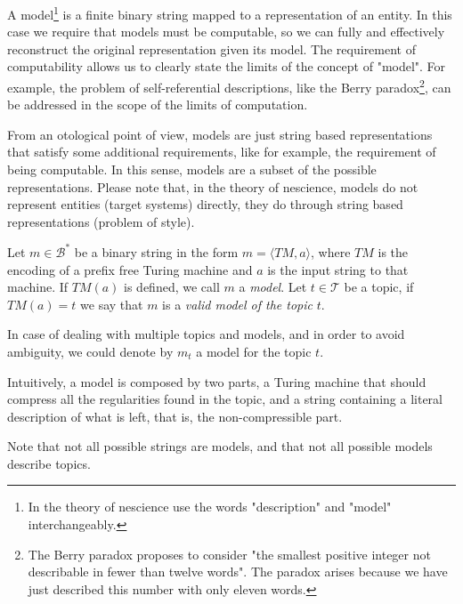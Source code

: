 A model\footnote{In the theory of nescience use the words "description" and "model" interchangeably.} is a finite binary string mapped to a representation of an entity. In this case we require that models must be computable, so we can fully and effectively reconstruct the original representation given its model. The requirement of computability allows us to clearly state the limits of the concept of "model". For example, the problem of self-referential descriptions, like the Berry paradox\footnote{The Berry paradox proposes to consider "the smallest positive integer not describable in fewer than twelve words". The paradox arises because we have just described this number with only eleven words.}, can be addressed in the scope of the limits of computation.

From an otological point of view, models are just string based representations that satisfy some additional requirements, like for example, the requirement of being computable. In this sense, models are a subset of the possible representations. Please note that, in the theory of nescience, models do not represent entities (target systems) directly, they do through string based representations (problem of style).

\begin{definition} [Model]
\label{def:descriptions_model}
Let $m \in \mathcal{B}^\ast$ be a binary string in the form $m = \langle TM,a \rangle$, where $TM$ is the encoding of a prefix free Turing machine and $a$ is the input string to that machine. If $TM(a)$ is defined, we call $m$ a \emph{model}. Let $t \in \mathcal{T}$ be a topic, if $TM(a) = t$ we say that $m$ is a \emph{valid model of the topic} $t$.
\end{definition}

\begin{notation}
In case of dealing with multiple topics and models, and in order to avoid ambiguity, we could denote by $m_t$ a model for the topic $t$.
\end{notation}

Intuitively, a model is composed by two parts, a Turing machine that should compress all the regularities found in the topic, and a string containing a literal description of what is left, that is, the non-compressible part.

Note that not all possible strings are models, and that not all possible models describe topics.

